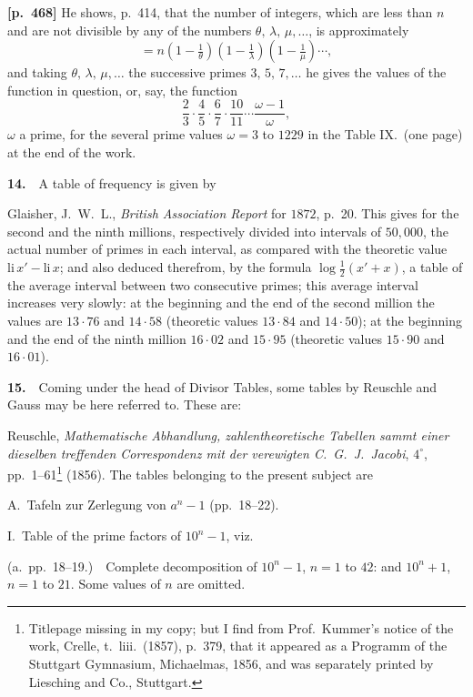 \documentclass[11pt,a4paper]{article}
\begin{document}
\bigskip
\noindent\textbf{[p.~468]}\quad
He shows, p.~414, that the number of integers, which are less than $n$ and are not divisible by any of the numbers $\theta,\,\lambda,\,\mu,\ldots$, is approximately
\[
=n\!\left(1-\tfrac{1}{\theta}\right)\!\left(1-\tfrac{1}{\lambda}\right)\!\left(1-\tfrac{1}{\mu}\right)\cdots,
\]
and taking $\theta,\,\lambda,\,\mu,\ldots$ the successive primes $3,\,5,\,7,\ldots$ he gives the values of the function in question, or, say, the function
\[
\frac{2}{3}\cdot\frac{4}{5}\cdot\frac{6}{7}\cdot\frac{10}{11}\cdots\frac{\omega-1}{\omega},
\]
$\omega$ a prime, for the several prime values $\omega=3$ to $1229$ in the Table IX.\ (one page) at the end of the work.

\textbf{14.}\ \ A table of frequency is given by

Glaisher, J.~W.~L., \textit{British Association Report} for $1872$, p.~20.   This gives for the second and the ninth millions, respectively divided into intervals of $50{,}000$, the actual number of primes in each interval, as compared with the theoretic value $\mathrm{li}\,x'-\mathrm{li}\,x$; and also deduced therefrom, by the formula $\log\tfrac{1}{2}(x'+x)$, a table of the average interval between two consecutive primes; this average interval increases very slowly: at the beginning and the end of the second million the values are $13\cdot 76$ and $14\cdot 58$ (theoretic values $13\cdot 84$ and $14\cdot 50$); at the beginning and the end of the ninth million $16\cdot 02$ and $15\cdot 95$ (theoretic values $15\cdot 90$ and $16\cdot 01$).

\textbf{15.}\ \ Coming under the head of Divisor Tables, some tables by Reuschle and Gauss may be here referred to.   These are:

Reuschle, \textit{Mathematische Abhandlung, zahlentheoretische Tabellen sammt einer dieselben treffenden Correspondenz mit der verewigten C.~G.~J.~Jacobi}, $4^{\circ}$, pp.~1--61\footnote{Titlepage missing in my copy; but I find from Prof.\ Kummer's notice of the work, Crelle, t.~liii.\ (1857), p.~379, that it appeared as a Programm of the Stuttgart Gymnasium, Michaelmas, 1856, and was separately printed by Liesching and Co., Stuttgart.} (1856).   The tables belonging to the present subject are

A.\ Tafeln zur Zerlegung von $a^n-1$ (pp.~18--22).

I.\ Table of the prime factors of $10^n-1$, viz.

(a.\ pp.~18--19.)\ \ Complete decomposition of $10^n-1$, $n=1$ to $42$: and $10^n+1$, $n=1$ to $21$.   Some values of $n$ are omitted.
\end{document}
